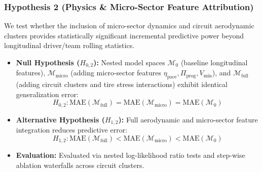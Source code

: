 \documentclass[journal]{IEEEtran}
\begin{document}
\subsubsection{Hypothesis 2 (Physics \& Micro-Sector Feature Attribution)}
We test whether the inclusion of micro-sector dynamics and circuit aerodynamic clusters provides statistically significant incremental predictive power beyond longitudinal driver/team rolling statistics.
\begin{itemize}
    \item \textbf{Null Hypothesis ($H_{0,2}$):} Nested model spaces $\mathcal{M}_0$ (baseline longitudinal features), $\mathcal{M}_{\text{micro}}$ (adding micro-sector features $\eta_{\text{pace}}, \Pi_{\text{prog}}, V_{\text{min}}$), and $\mathcal{M}_{\text{full}}$ (adding circuit clusters and tire stress interactions) exhibit identical generalization error:
    \begin{equation}
    H_{0,2}: \text{MAE}(\mathcal{M}_{\text{full}}) = \text{MAE}(\mathcal{M}_{\text{micro}}) = \text{MAE}(\mathcal{M}_0)
    \end{equation}
    \item \textbf{Alternative Hypothesis ($H_{1,2}$):} Full aerodynamic and micro-sector feature integration reduces predictive error:
    \begin{equation}
    H_{1,2}: \text{MAE}(\mathcal{M}_{\text{full}}) < \text{MAE}(\mathcal{M}_{\text{micro}}) < \text{MAE}(\mathcal{M}_0)
    \end{equation}
    \item \textbf{Evaluation:} Evaluated via nested log-likelihood ratio tests and step-wise ablation waterfalls across circuit clusters.
\end{itemize}
\end{document}
